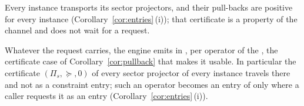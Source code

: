 
Every instance transports its sector projectors, and their pull-backs are
positive for every instance (Corollary~\ref{cor:entries}\,(i)); that
certificate is a property of the channel and does not wait for a request.

\begin{requirement}\label{req:transported-set-certificates}
Whatever the request carries, the engine emits in
, per operator of the ,
the certificate case of Corollary~\ref{cor:pullback} that makes it usable. In
particular the certificate $(\Pi_s,\succeq,0)$ of every sector projector of
every instance travels there and not as a constraint entry; such an operator
becomes an entry of  only where a caller requests it
as an entry (Corollary~\ref{cor:entries}\,(i)).
\end{requirement}
